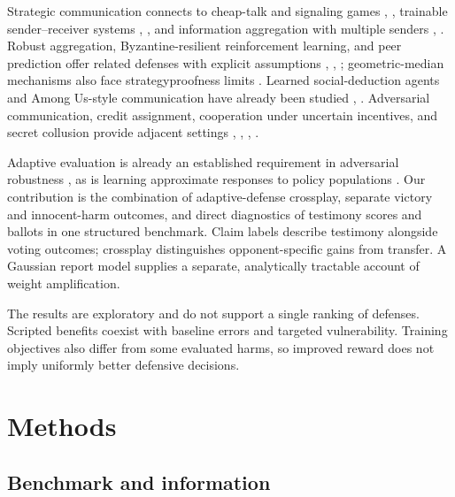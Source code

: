 \documentclass[
  12pt,
]{article}
\begin{document}
Strategic communication connects to cheap-talk and signaling games
, ,
trainable sender--receiver systems
,
, and information aggregation with
multiple senders ,
. Robust aggregation,
Byzantine-resilient reinforcement learning, and peer prediction offer
related defenses with explicit assumptions
, ,
; geometric-median mechanisms also
face strategyproofness limits .
Learned social-deduction agents and Among Us-style communication have
already been studied ,
. Adversarial communication, credit
assignment, cooperation under uncertain incentives, and secret collusion
provide adjacent settings ,
, ,
.

Adaptive evaluation is already an established requirement in adversarial
robustness , as is learning
approximate responses to policy populations
. Our contribution is the
combination of adaptive-defense crossplay, separate victory and
innocent-harm outcomes, and direct diagnostics of testimony scores and
ballots in one structured benchmark. Claim labels describe testimony
alongside voting outcomes; crossplay distinguishes opponent-specific
gains from transfer. A Gaussian report model supplies a separate,
analytically tractable account of weight amplification.

The results are exploratory and do not support a single ranking of
defenses. Scripted benefits coexist with baseline errors and targeted
vulnerability. Training objectives also differ from some evaluated
harms, so improved reward does not imply uniformly better defensive
decisions.

\FloatBarrier

\section{Methods}\label{methods}

\FloatBarrier

\subsection{Benchmark and information}\label{benchmark-and-information}
\end{document}
